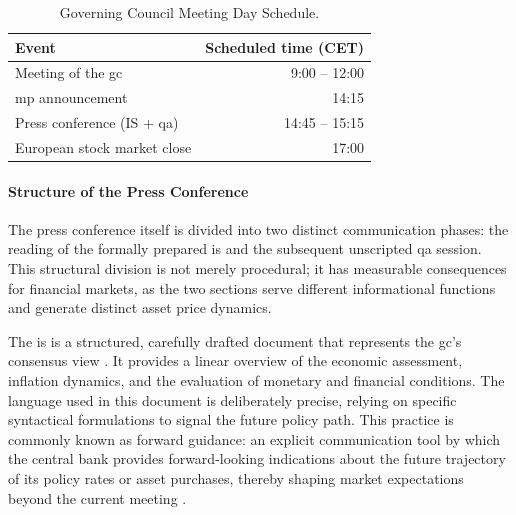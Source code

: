 \begin{table}[ht]
    \centering
    \caption[Governing Council Meeting Day Schedule]{Governing Council Meeting Day Schedule.}
    \label{tab:meet_schedule}
    \begin{tabular}{@{}lr@{}}
        \toprule
        \textbf{Event}                         & \textbf{Scheduled time (CET)} \\ \midrule
        Meeting of the \gls{gc}                & 9:00 -- 12:00                 \\
        \gls{mp} announcement                  & 14:15                         \\
        Press conference (IS + \gls{qa}) & 14:45 -- 15:15                \\
        European stock market close            & 17:00                         \\ \bottomrule
    \end{tabular}
\end{table}


\paragraph{Structure of the Press Conference}
\label{sec:press_structure}
The press conference itself is divided into two distinct communication phases: the reading of the formally prepared \gls{is} and the subsequent unscripted \gls{qa} session. This structural division is not merely procedural; it has measurable consequences for financial markets, as the two sections serve different informational functions and generate distinct asset price dynamics.

The \gls{is} is a structured, carefully drafted document that represents the \gls{gc}'s consensus view \cite{ECB_WP2742}. It provides a linear overview of the economic assessment, inflation dynamics, and the evaluation of monetary and financial conditions. The language used in this document is deliberately precise, relying on specific syntactical formulations to signal the future policy path. This practice is commonly known as forward guidance: an explicit communication tool by which the central bank provides forward-looking indications about the future trajectory of its policy rates or asset purchases, thereby shaping market expectations beyond the current meeting \cite{blinder2008central}.

